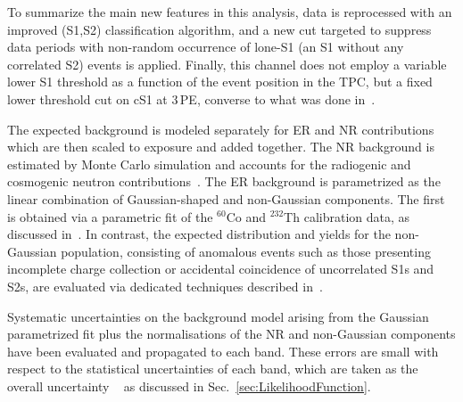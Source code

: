 To summarize the main new features in this analysis, data is reprocessed with an improved (S1,S2) classification algorithm, and a new cut targeted to suppress data periods with non-random occurrence of lone-S1 (an S1 without 
any correlated S2) events is applied. 
Finally, this channel does not employ a variable lower S1 threshold as a function of the event position in the TPC, but a fixed 
lower threshold cut on cS1 at 3\,PE, converse to what was done in~\cite{xe100_run_combination}.

The expected background is modeled separately for ER and NR contributions which are then scaled to exposure and added together.
The NR background is estimated by Monte Carlo simulation and accounts for the radiogenic and cosmogenic neutron
contributions~\cite{Aprile:2013tov}.
The ER background is parametrized as the linear combination of Gaussian-shaped and non-Gaussian components.
The first is obtained via a parametric fit of the $^{60}$Co and $^{232}$Th calibration data, as discussed in~\cite{xe100_run10_si}.
In contrast, the expected distribution and yields for the non-Gaussian population, consisting of anomalous events such as those 
presenting incomplete charge collection or accidental coincidence of uncorrelated S1s and S2s,  
are evaluated via dedicated techniques described in~\cite{xe100_run_combination}.

Systematic uncertainties on the background model arising from the Gaussian parametrized fit plus the normalisations of the NR and non-Gaussian components have been evaluated and propagated to each band. These errors are small with respect to the statistical uncertainties of each band, which are taken as the overall uncertainty ~\cite{xe100_run_combination} as discussed in Sec.~\ref{sec:LikelihoodFunction}.

